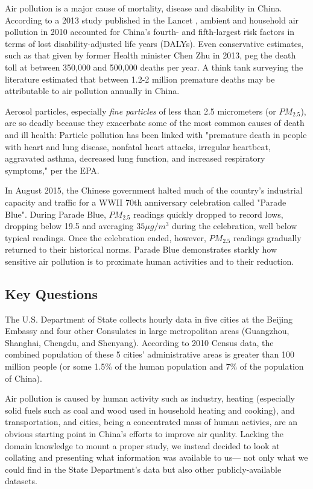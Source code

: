 \documentclass[11pt]{article} %
\begin{document}
Air pollution is a major cause of mortality, disease and disability in China.\cite{Yang10, Stein14} 
According to a 2013 study published in the Lancet \cite{Yang10}, ambient and household
air pollution in 2010 accounted for China's fourth- and fifth-largest risk factors
in terms of lost disability-adjusted life years (DALYs)\cite{WHO16}.
Even conservative estimates, such as that given by former Health minister Chen Zhu
in 2013\cite{Moore14}, peg the death toll at between 350,000 and 500,000 deaths per year.
A think tank surveying the literature estimated
that between 1.2-2 million premature deaths may be attributable to air pollution annually in China\cite{Rohde15}. 

Aerosol particles, especially \textit{fine particles} of less than 2.5 micrometers (or \(PM_{2.5}\)),
are so deadly because they exacerbate some of the
most common causes of death and ill health: Particle pollution has been linked with "premature death 
in people with heart and lung disease, nonfatal heart attacks, irregular heartbeat,
aggravated asthma, decreased lung function, and increased respiratory symptoms," per the EPA\cite{EPA16}. 

In August 2015, the Chinese government halted much of the country's
industrial capacity and traffic for a WWII 70th anniversary celebration called "Parade Blue"\cite{Boren15}.
During Parade Blue, \(PM_{2.5}\) readings quickly 
dropped to record lows, dropping below 19.5 and averaging 
\(35 \mu g/m^3\) during the celebration, well below typical readings. 
Once the celebration ended, however,
\(PM_{2.5}\) readings gradually returned to their historical norms. Parade Blue demonstrates
starkly how sensitive air pollution is to proximate human activities
and to their reduction.

\subsection{Key Questions}

The U.S. Department of State collects hourly data in five cities at the Beijing Embassy
and four other Consulates in large metropolitan areas (Guangzhou, Shanghai, Chengdu, and
Shenyang). According to 2010 Census data, the combined population of these 5 cities' administrative areas is greater than
100 million people (or some 1.5\% of the human population 
and 7\% of the population of China)\cite{Wiki16}.

Air pollution is caused by human activity
such as industry, heating (especially solid fuels such as coal and wood used in household heating and cooking),
and transportation, and cities, being a concentrated mass of human activies, are an obvious starting point
in China's efforts to improve air quality. Lacking the domain knowledge to mount a proper study, we
instead decided to look at collating and presenting what information was available to us---
not only what we could find in the State Department's data but also other publicly-available datasets.
\end{document}
